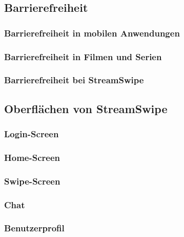 \documentclass[11pt,a4paper]{article}
\begin{document}
\subsection{Barrierefreiheit}
\label{sec:barrierefreiheit}

\subsubsection{Barrierefreiheit in mobilen Anwendungen}

\subsubsection{Barrierefreiheit in Filmen und Serien}

\subsubsection{Barrierefreiheit bei StreamSwipe}
\label{sec:bf-streamswipe}

\subsection{Oberflächen von StreamSwipe}
\label{sec:UI-alle}

\subsubsection{Login-Screen}
\label{sec:loginscreen}

\subsubsection{Home-Screen}
\label{sec:homescreen}

\subsubsection{Swipe-Screen}
\label{sec:swipescreen}

\subsubsection{Chat}
\label{sec:UI-Chat}

\subsubsection{Benutzerprofil}
\label{sec:benutzerprofil}

\end{document}

